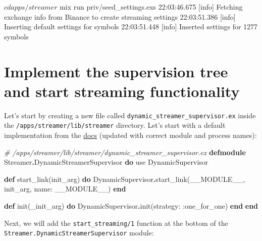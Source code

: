 \documentclass[
  oneside]{book}
\newenvironment{Shaded}{\begin{snugshade}}{\end{snugshade}}
\newcommand{\CommentTok}[1]{\textcolor[rgb]{0.56,0.35,0.01}{\textit{#1}}}
\newcommand{\ConstantTok}[1]{\textcolor[rgb]{0.00,0.00,0.00}{#1}}
\newcommand{\ExtensionTok}[1]{#1}
\newcommand{\ImportTok}[1]{#1}
\newcommand{\KeywordTok}[1]{\textcolor[rgb]{0.13,0.29,0.53}{\textbf{#1}}}
\newcommand{\NormalTok}[1]{#1}
\newcommand{\OperatorTok}[1]{\textcolor[rgb]{0.81,0.36,0.00}{\textbf{#1}}}
\newcommand{\VariableTok}[1]{\textcolor[rgb]{0.00,0.00,0.00}{#1}}
\begin{document}
\begin{Shaded}
\begin{Highlighting}[]
\ExtensionTok{$}\NormalTok{ cd apps/streamer}
\ExtensionTok{$}\NormalTok{ mix run priv/seed\_settings.exs}
\ExtensionTok{22:03:46.675}\NormalTok{ [info]  Fetching exchange info from Binance to create streaming settings}
\ExtensionTok{22:03:51.386}\NormalTok{ [info]  Inserting default settings for symbols}
\ExtensionTok{22:03:51.448}\NormalTok{ [info]  Inserted settings for 1277 symbols}
\end{Highlighting}
\end{Shaded}

\hypertarget{implement-the-supervision-tree-and-start-streaming-functionality}{%
\section{Implement the supervision tree and start streaming functionality}\label{implement-the-supervision-tree-and-start-streaming-functionality}}

Let's start by creating a new file called \texttt{dynamic\_streamer\_supervisor.ex} inside the \texttt{/apps/streamer/lib/streamer} directory. Let's start with a default implementation from the \href{https://hexdocs.pm/elixir/master/DynamicSupervisor.html\#module-module-based-supervisors}{docs} (updated with correct module and process names):

\begin{Shaded}
\begin{Highlighting}[]
\CommentTok{\# /apps/streamer/lib/streamer/dynamic\_streamer\_supervisor.ex}
\KeywordTok{defmodule} \ConstantTok{Streamer}\OperatorTok{.}\ConstantTok{DynamicStreamerSupervisor} \KeywordTok{do}
  \ImportTok{use} \ConstantTok{DynamicSupervisor}

  \KeywordTok{def}\NormalTok{ start\_link(init\_arg) }\KeywordTok{do}
    \ConstantTok{DynamicSupervisor}\OperatorTok{.}\NormalTok{start\_link(}\ConstantTok{\_\_MODULE\_\_}\NormalTok{, init\_arg, }\VariableTok{name:} \ConstantTok{\_\_MODULE\_\_}\NormalTok{)}
  \KeywordTok{end}

  \KeywordTok{def}\NormalTok{ init(\_init\_arg) }\KeywordTok{do}
    \ConstantTok{DynamicSupervisor}\OperatorTok{.}\NormalTok{init(}\VariableTok{strategy:} \VariableTok{:one\_for\_one}\NormalTok{)}
  \KeywordTok{end}
\KeywordTok{end}
\end{Highlighting}
\end{Shaded}

Next, we will add the \texttt{start\_streaming/1} function at the bottom of the \texttt{Streamer.DynamicStreamerSupervisor} module:
\end{document}
